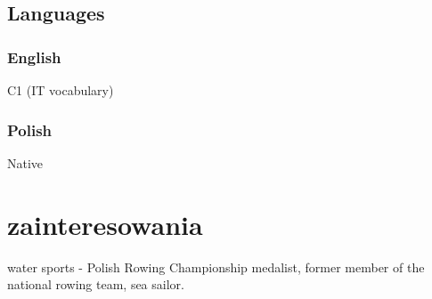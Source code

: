 \documentclass{article}
\begin{document}
\begin{minipage}[t]{.4\textwidth}
	\subsection{Languages}
	\subsubsection{English} C1 (IT vocabulary)
    \subsubsection{Polish} Native

	\vspace{1em}

	\section{zainteresowania}
    water sports - Polish Rowing Championship medalist, former member of the national rowing team, sea sailor.

\end{minipage}
\end{document}
